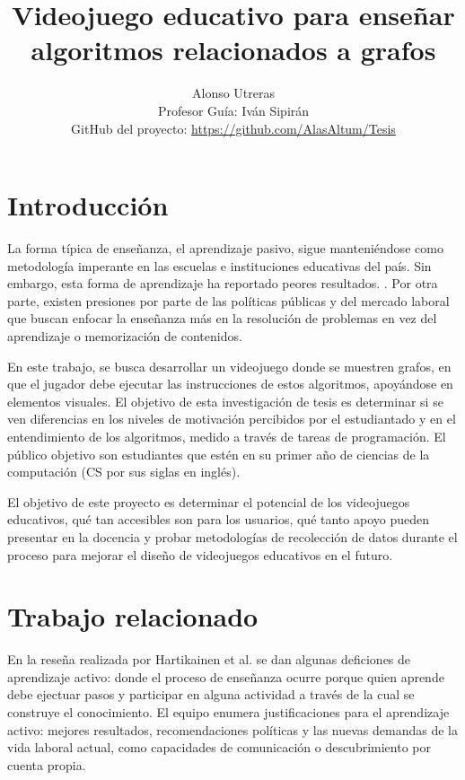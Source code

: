 \documentclass[submission]{eptcs}
\title{Videojuego educativo para enseñar algoritmos relacionados a grafos}
\author{ Alonso Utreras\\
Profesor Guía: Iván Sipirán\\
GitHub del proyecto: \url{https://github.com/AlasAltum/Tesis}
\institute{Departmento de Ciencias de la Computación\\
Universidad de Chile\\
Santiago, Chile}
\email{alonso.utreras@ug.uchile.cl}
\email{autreras@dcc.uchile.cl}
}
\begin{document}
\maketitle

\section{Introducción}
 
La forma típica de enseñanza, el aprendizaje pasivo, sigue manteniéndose como metodología imperante en las escuelas e instituciones
educativas del país. Sin embargo, esta forma de aprendizaje ha reportado peores resultados. \cite{active_learning_review}. Por otra parte,
existen presiones por parte de las políticas públicas y del mercado laboral que buscan enfocar la enseñanza más en la resolución de problemas
en vez del aprendizaje o memorización de contenidos.

En este trabajo, se busca desarrollar un videojuego donde se muestren grafos, en que el jugador
debe ejecutar las instrucciones de estos algoritmos, apoyándose en elementos visuales. El objetivo de esta investigación de tesis es 
determinar si se ven diferencias en los niveles de motivación percibidos por el estudiantado y en el entendimiento
de los algoritmos, medido a través de tareas de programación. El público objetivo son estudiantes
que estén en su primer año de ciencias de la computación (CS por sus siglas en inglés).

El objetivo de este proyecto es determinar el potencial de los videojuegos educativos, qué tan accesibles son para los usuarios,
qué tanto apoyo pueden presentar en la docencia y probar metodologías de recolección de datos durante el proceso para mejorar el
diseño de videojuegos educativos en el futuro.


\section{Trabajo relacionado} 


En la reseña realizada por Hartikainen et al. \cite{active_learning_review} se dan algunas deficiones de aprendizaje activo:
donde el proceso de enseñanza ocurre porque quien aprende debe ejectuar pasos y participar en alguna actividad a través de la cual se construye el conocimiento. 
El equipo enumera justificaciones para el aprendizaje activo:  mejores resultados, recomendaciones políticas y las nuevas demandas de la vida laboral actual,
como capacidades de comunicación o descubrimiento por cuenta propia. 
\end{document}
